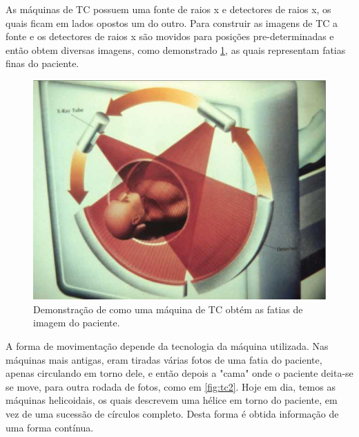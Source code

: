 As máquinas de TC possuem uma fonte de raios x e detectores de raios x, os quais ficam em lados opostos um do outro. Para construir as imagens de TC a fonte e os detectores de raios x são movidos para posições pre-determinadas e então obtem diversas imagens, como demonstrado \ref{fig:tc1}, as quais representam fatias finas do paciente.

\begin{figure}[ht]
 \begin{center}
  \includegraphics{imagens/tc.jpg}
 \end{center}
 \caption{Demonstração de como uma máquina de TC obtém as fatias de imagem do paciente.}
 \label{fig:tc1}
\end{figure}

A forma de movimentação depende da tecnologia da máquina utilizada. Nas máquinas mais antigas, eram tiradas várias fotos de uma fatia do paciente, apenas circulando em torno dele, e então depois a "cama" onde o paciente deita-se se move, para outra rodada de fotos, como em \ref{fig:tc2}. Hoje em dia, temos as máquinas helicoidais, os quais descrevem uma hélice em torno do paciente, em vez de uma sucessão de círculos completo. Desta forma é obtida informação de uma forma contínua.

